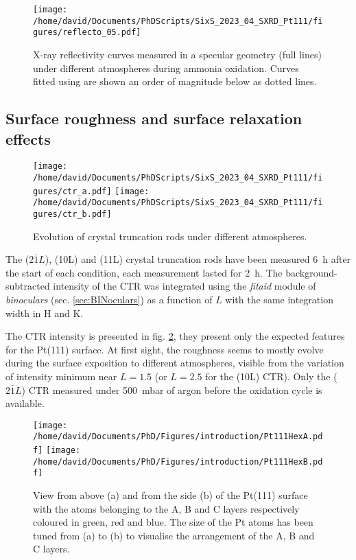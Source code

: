 \begin{figure}[!htb]
    \centering
    \texttt{[image: /home/david/Documents/PhDScripts/SixS\_2023\_04\_SXRD\_Pt111/figures/reflecto\_05.pdf]}
    \caption{
    	X-ray reflectivity curves measured in a specular geometry (full lines) under different atmospheres during ammonia oxidation.
    	Curves fitted using  are shown an order of magnitude below as dotted lines.
    }
    \label{fig:Reflecto5}
\end{figure}

\subsection{Surface roughness and surface relaxation effects}

\begin{figure}[!htb]
    \centering
    \texttt{[image: /home/david/Documents/PhDScripts/SixS\_2023\_04\_SXRD\_Pt111/figures/ctr\_a.pdf]}
    \texttt{[image: /home/david/Documents/PhDScripts/SixS\_2023\_04\_SXRD\_Pt111/figures/ctr\_b.pdf]}
    \caption{
        Evolution of crystal truncation rods under different atmospheres.
    }
    \label{fig:CTRPt111}
\end{figure}

The ($2\bar{1}L$), (10L) and (11L) crystal truncation rods have been measured \qty{6}{\hour} after the start of each condition, each measurement lasted for \qty{2}{\hour}.
The background-subtracted intensity of the CTR was integrated using the \textit{fitaid} module of \textit{binoculars} (sec. \ref{sec:BINoculars}) as a function of $L$ with the same integration width in H and K.

The CTR intensity is presented in fig. \ref{fig:CTRPt111}, they present only the expected features for the Pt(111) surface.
At first sight, the roughness seems to mostly evolve during the surface exposition to different atmospheres, visible from the variation of intensity minimum near $L=1.5$ (or $L=2.5$ for the (10L) CTR).
Only the ($2\bar{1}L$) CTR measured under \qty{500}{\milli\bar} of argon before the oxidation cycle is available.

\begin{figure}[!htb]
    \centering
    \texttt{[image: /home/david/Documents/PhD/Figures/introduction/Pt111HexA.pdf]}
    \texttt{[image: /home/david/Documents/PhD/Figures/introduction/Pt111HexB.pdf]}
    \caption{
        View from above (a) and from the side (b) of the Pt(111) surface with the atoms belonging to the A, B and C layers respectively coloured in green, red and blue.
        The size of the Pt atoms has been tuned from (a) to (b) to visualise the arrangement of the A, B and C layers.
    }
    \label{fig:Pt111StructureSideAndTop}
\end{figure}

